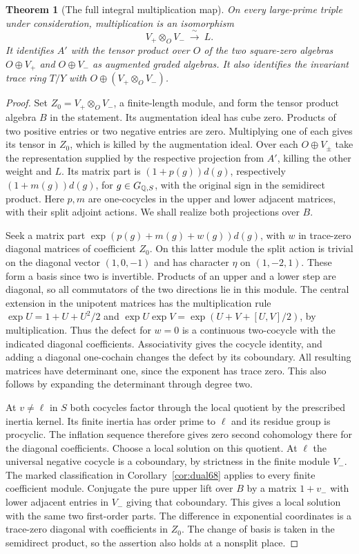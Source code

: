 \documentclass[a4paper,11pt]{article}
\newtheorem{theorem}[proposition]{Theorem}
\theoremstyle{definition}
\theoremstyle{remark}
\numberwithin{equation}{section}
\begin{document}
\begin{theorem}[The full integral multiplication map]
\label{thm:tensortrace382}
On every large-prime triple under consideration, multiplication
is an isomorphism
\[
             V_+\otimes_O V_-\ \xrightarrow{\ \sim\ }\ L .
\]
It identifies \(A'\) with the tensor product over \(O\) of the
two square-zero algebras \(O\oplus V_+\) and \(O\oplus V_-\)
as augmented graded algebras. It also identifies the invariant
trace ring \(T/Y\) with \(O\oplus(V_+\otimes_O V_-)\).
\end{theorem}
\begin{proof}
Set \(Z_0=V_+\otimes_O V_-\), a finite-length module, and
form the tensor product algebra \(B\) in the statement.
Its augmentation ideal has cube zero. Products of two
positive entries or two negative entries are zero. Multiplying
one of each gives its tensor in \(Z_0\), which is killed by
the augmentation ideal. Over each \(O\oplus V_\pm\) take
the representation supplied by the respective projection
from \(A'\), killing the other weight and \(L\).
Its matrix part is \((1+p(g))d(g)\), respectively
\((1+m(g))d(g)\), for \(g\in G_{\mathbb Q,S}\), with the original
sign in the semidirect product. Here \(p,m\) are one-cocycles
in the upper and lower adjacent matrices, with their split
adjoint actions. We shall realize both projections over \(B\).

Seek a matrix part \(\exp(p(g)+m(g)+w(g))d(g)\), with \(w\)
in trace-zero diagonal matrices of coefficient \(Z_0\).
On this latter module the split action is trivial on the
diagonal vector \((1,0,-1)\) and has character \(\eta\)
on \((1,-2,1)\). These form a basis since two is invertible.
Products of an upper and a lower step are diagonal, so all
commutators of the two directions lie in this module.
The central extension in the unipotent matrices has the multiplication rule
\(\exp U=1+U+U^2/2\) and
\(\exp U\exp V=\exp(U+V+[U,V]/2)\), by multiplication.
Thus the defect for \(w=0\) is a continuous two-cocycle
with the indicated diagonal coefficients. Associativity gives
the cocycle identity, and adding a diagonal one-cochain changes
the defect by its coboundary. All resulting matrices have
determinant one, since the exponent has trace zero. This
also follows by expanding the determinant through degree two.

At \(v\ne\ell\) in \(S\) both cocycles factor through the
local quotient by the prescribed inertia kernel. Its finite
inertia has order prime to \(\ell\) and its residue group is
procyclic. The inflation sequence therefore gives zero
second cohomology there for the diagonal coefficients.
Choose a local solution on this quotient. At \(\ell\) the
universal negative cocycle is a coboundary, by strictness
in the finite module \(V_-\). The marked classification in
Corollary~\ref{cor:dual68} applies to every finite coefficient
module. Conjugate the pure upper lift over \(B\) by a
matrix \(1+v_-\) with lower adjacent entries in \(V_-\)
giving that coboundary. This gives a local solution with
the same two first-order parts. The difference in exponential
coordinates is a trace-zero diagonal with coefficients in
\(Z_0\). The change of basis is taken in the semidirect
product, so the assertion also holds at a nonsplit place.


\end{proof}
\end{document}
